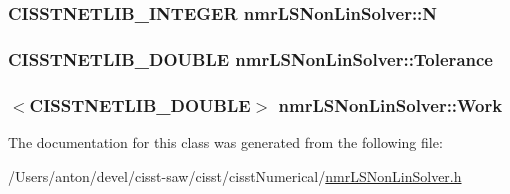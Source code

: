 \subsubsection[{N}]{\setlength{\rightskip}{0pt plus 5cm}C\+I\+S\+S\+T\+N\+E\+T\+L\+I\+B\+\_\+\+I\+N\+T\+E\+G\+E\+R nmr\+L\+S\+Non\+Lin\+Solver\+::\+N\hspace{0.3cm}{\ttfamily [protected]}}\label{classnmr_l_s_non_lin_solver_a5ee3cc88525a1b1f9749729b676135fe}
\hypertarget{classnmr_l_s_non_lin_solver_a4becb9d9f32e92e2bd373a353ddb7b81}{}
\subsubsection[{Tolerance}]{\setlength{\rightskip}{0pt plus 5cm}C\+I\+S\+S\+T\+N\+E\+T\+L\+I\+B\+\_\+\+D\+O\+U\+B\+L\+E nmr\+L\+S\+Non\+Lin\+Solver\+::\+Tolerance\hspace{0.3cm}{\ttfamily [protected]}}\label{classnmr_l_s_non_lin_solver_a4becb9d9f32e92e2bd373a353ddb7b81}
\hypertarget{classnmr_l_s_non_lin_solver_a7ba55974c126ea40c19938c09c6ac730}{}
\subsubsection[{Work}]{$<$C\+I\+S\+S\+T\+N\+E\+T\+L\+I\+B\+\_\+\+D\+O\+U\+B\+L\+E$>$ nmr\+L\+S\+Non\+Lin\+Solver\+::\+Work\hspace{0.3cm}{\ttfamily [protected]}}\label{classnmr_l_s_non_lin_solver_a7ba55974c126ea40c19938c09c6ac730}


The documentation for this class was generated from the following file\+:\begin{DoxyCompactItemize}
\item 
/\+Users/anton/devel/cisst-\/saw/cisst/cisst\+Numerical/\hyperlink{nmr_l_s_non_lin_solver_8h}{nmr\+L\+S\+Non\+Lin\+Solver.\+h}\end{DoxyCompactItemize}
